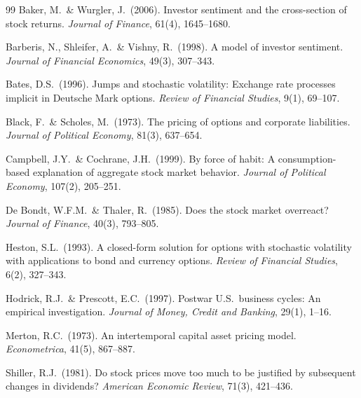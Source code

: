 \documentclass[12pt,a4paper]{article}
\theoremstyle{definition}
\theoremstyle{remark}
\begin{document}
\newpage
\begin{thebibliography}{99}
Baker, M.\ \& Wurgler, J.\ (2006).
Investor sentiment and the cross-section of stock returns.
\textit{Journal of Finance}, 61(4), 1645--1680.

Barberis, N., Shleifer, A.\ \& Vishny, R.\ (1998).
A model of investor sentiment.
\textit{Journal of Financial Economics}, 49(3), 307--343.

Bates, D.S.\ (1996).
Jumps and stochastic volatility: Exchange rate processes implicit in
Deutsche Mark options.
\textit{Review of Financial Studies}, 9(1), 69--107.

Black, F.\ \& Scholes, M.\ (1973).
The pricing of options and corporate liabilities.
\textit{Journal of Political Economy}, 81(3), 637--654.

Campbell, J.Y.\ \& Cochrane, J.H.\ (1999).
By force of habit: A consumption-based explanation of aggregate stock
market behavior.
\textit{Journal of Political Economy}, 107(2), 205--251.

De Bondt, W.F.M.\ \& Thaler, R.\ (1985).
Does the stock market overreact?
\textit{Journal of Finance}, 40(3), 793--805.

Heston, S.L.\ (1993).
A closed-form solution for options with stochastic volatility with
applications to bond and currency options.
\textit{Review of Financial Studies}, 6(2), 327--343.

Hodrick, R.J.\ \& Prescott, E.C.\ (1997).
Postwar U.S.\ business cycles: An empirical investigation.
\textit{Journal of Money, Credit and Banking}, 29(1), 1--16.

Merton, R.C.\ (1973).
An intertemporal capital asset pricing model.
\textit{Econometrica}, 41(5), 867--887.

Shiller, R.J.\ (1981).
Do stock prices move too much to be justified by subsequent changes
in dividends?
\textit{American Economic Review}, 71(3), 421--436.
\end{thebibliography}
\end{document}
